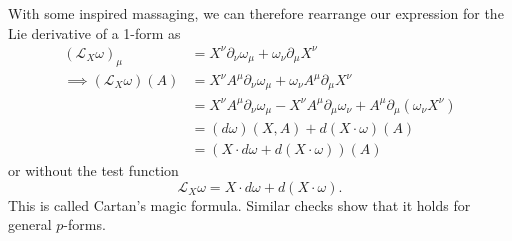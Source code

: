 \documentclass[11pt,letterpaper]{article}
\newcommand{\LP}{\left(}
\newcommand{\RP}{\right)}
\newcommand{\mc}[1]{\mathcal{#1}}
\newcommand{\D}{\partial}
\begin{document}
With some inspired massaging, we can therefore rearrange our expression for the Lie derivative of a 1-form as \begin{equation}
\begin{aligned}
\LP \mc{L}_X \omega \RP_\mu & = X^\nu \D_\nu \omega_\mu + \omega_\nu \D_\mu X^\nu \\
\implies \LP \mc{L}_X \omega \RP(A) & = X^\nu A^\mu \D_\nu \omega_\mu + \omega_\nu A^\mu \D_\mu X^\nu \\
& =  X^\nu A^\mu \D_\nu \omega_\mu - X^\nu A^\mu \D_\mu \omega_\nu + A^\mu \D_\mu (\omega_\nu X^\nu) \\
& = (d \omega)(X,A) + d (X \cdot \omega) (A) \\
& = \LP X \cdot d \omega + d (X \cdot \omega) \RP (A)
\end{aligned}
\end{equation}
or without the test function \begin{equation}
\mc{L}_X \omega = X \cdot d \omega + d (X \cdot \omega).
\end{equation}
This is called Cartan's magic formula. Similar checks show that it holds for general $p$-forms.




\end{document}
